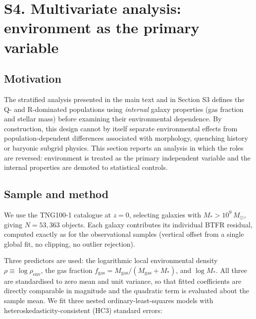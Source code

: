 ﻿%

\section*{S4. Multivariate analysis: environment as the primary variable}
\label{sec:S4}

\subsection*{Motivation}

The stratified analysis presented in the main text and in Section S3 defines the
Q- and R-dominated populations using \textit{internal} galaxy properties (gas
fraction and stellar mass) before examining their environmental dependence. By
construction, this design cannot by itself separate environmental effects
from population-dependent differences associated with morphology, quenching
history or baryonic subgrid physics. This section reports an analysis in which
the roles are reversed: environment is treated as the primary independent
variable and the internal properties are demoted to statistical controls.

\subsection*{Sample and method}

We use the TNG100-1 catalogue at $z = 0$, selecting galaxies with
$M_* > 10^9\,M_\odot$, giving $N = 53{,}363$ objects. Each galaxy contributes its
individual BTFR residual, computed exactly as for the observational samples
(vertical offset from a single global fit, no clipping, no outlier rejection).

Three predictors are used: the logarithmic local environmental density
$\rho \equiv \log \rho_{\mathrm{env}}$, the gas fraction
$f_{\mathrm{gas}} = M_{\mathrm{gas}}/(M_{\mathrm{gas}} + M_*)$, and $\log M_*$.
All three are standardised to zero mean and unit variance, so that fitted
coefficients are directly comparable in magnitude and the quadratic term is
evaluated about the sample mean. We fit three nested ordinary-least-squares
models with heteroskedasticity-consistent (HC3) standard errors:

